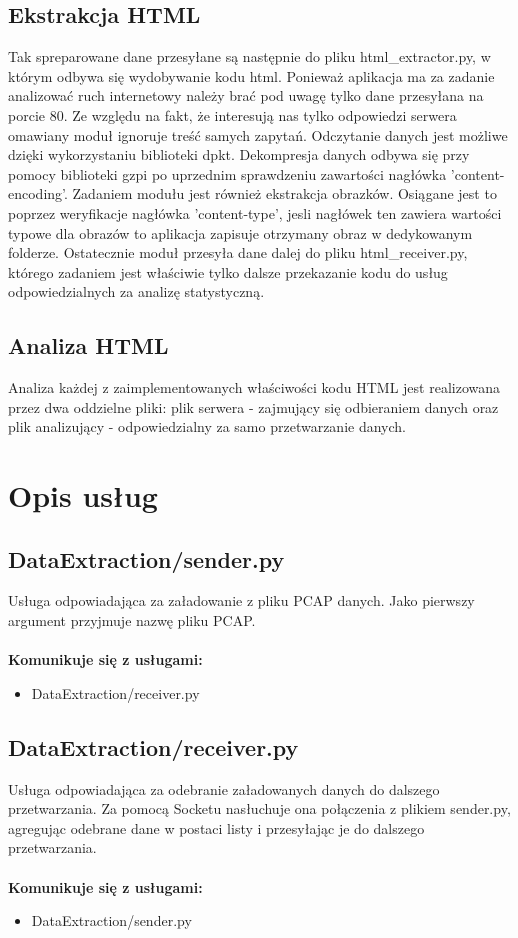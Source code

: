 \documentclass[12pt]{article}
\begin{document}
\subsection{Ekstrakcja HTML}
Tak spreparowane dane przesyłane są następnie do pliku html\_extractor.py, w którym odbywa się wydobywanie kodu html. 
Ponieważ aplikacja ma za zadanie analizować ruch internetowy należy brać pod uwagę tylko dane przesyłana na porcie 80. Ze względu na fakt, że interesują nas tylko odpowiedzi serwera omawiany moduł ignoruje treść samych zapytań. Odczytanie danych jest możliwe dzięki wykorzystaniu biblioteki dpkt. Dekompresja danych odbywa się przy pomocy biblioteki gzpi po uprzednim sprawdzeniu zawartości nagłówka 'content-encoding'. Zadaniem modułu jest również ekstrakcja obrazków. Osiągane jest to poprzez weryfikacje nagłówka 'content-type', jesli nagłówek ten zawiera wartości typowe dla obrazów to aplikacja zapisuje otrzymany obraz w dedykowanym folderze. Ostatecznie moduł przesyła dane dalej do pliku html\_receiver.py, którego zadaniem jest właściwie tylko dalsze przekazanie kodu do usług odpowiedzialnych za analizę statystyczną.

\subsection{Analiza HTML}
Analiza każdej z zaimplementowanych właściwości kodu HTML jest realizowana przez dwa oddzielne pliki: plik serwera - zajmujący się odbieraniem danych oraz plik analizujący - odpowiedzialny za samo przetwarzanie danych. 

\section{Opis usług}
\subsection{DataExtraction/sender.py}
Usługa odpowiadająca za załadowanie z pliku PCAP danych. Jako pierwszy argument przyjmuje nazwę pliku PCAP. 
\mbox{}\\\\
\textbf{Komunikuje się z usługami:}\\
\begin{itemize}
\item DataExtraction/receiver.py
\end{itemize} 

\subsection{DataExtraction/receiver.py}
Usługa odpowiadająca za odebranie załadowanych danych do dalszego przetwarzania. Za pomocą Socketu nasłuchuje ona połączenia z plikiem sender.py, agregując odebrane dane w postaci listy i przesyłając je do dalszego przetwarzania.
\mbox{}\\\\
\textbf{Komunikuje się z usługami:}\\
\begin{itemize}
\item DataExtraction/sender.py
\end{itemize} 
\end{document}
